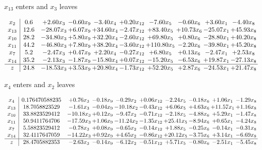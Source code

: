 \documentclass[9pt]{article}
\begin{document}
 $ x_{13} $ enters and $ x_{3} $ leaves 

 \[\begin{array}{c| c c@{\hskip 2pt} c@{\hskip 2pt} c@{\hskip 2pt} c@{\hskip 2pt} c@{\hskip 2pt} c@{\hskip 2pt} c@{\hskip 2pt} c@{\hskip 2pt} }
 x_{2}   &  0.6 & +  2.60 x_{3} & -0.60 x_{9} & -3.40 x_{4} & +  0.20 x_{12} & -7.60 x_{5} & -0.60 x_{6} & +  3.60 x_{1} & -4.40 x_{8}\\
 x_{13}   &  12.6 & -28.07 x_{3} & +  6.07 x_{9} & + 34.60 x_{4} & -2.47 x_{12} & + 83.40 x_{5} & + 10.73 x_{6} & -25.07 x_{1} & + 45.93 x_{8}\\
 x_{10}   &  28.2 & -34.80 x_{3} & +  5.80 x_{9} & + 32.20 x_{4} & -2.60 x_{12} & + 69.80 x_{5} & +  0.80 x_{6} & -28.80 x_{1} & + 40.20 x_{8}\\
 x_{11}   &  44.2 & -46.80 x_{3} & +  7.80 x_{9} & + 38.20 x_{4} & -3.60 x_{12} & + 110.80 x_{5} & -2.20 x_{6} & -39.80 x_{1} & + 45.20 x_{8}\\
 x_{7}   &  5.2 & -2.47 x_{3} & +  0.47 x_{9} & +  2.20 x_{4} & -0.27 x_{12} & +  6.80 x_{5} & +  0.13 x_{6} & -2.47 x_{1} & +  2.53 x_{8}\\
 x_{14}   &  35.2 & -2.13 x_{3} & -1.87 x_{9} & -15.80 x_{4} & +  0.07 x_{12} & -15.20 x_{5} & -6.53 x_{6} & + 19.87 x_{1} & -27.13 x_{8}\\
\hline
z    &  24.8 & -18.53 x_{3} & +  3.53 x_{9} & + 20.80 x_{4} & -1.73 x_{12} & + 52.20 x_{5} & +  2.87 x_{6} & -24.53 x_{1} & + 21.47 x_{8}\\
\end{array}\]


 $ x_{4} $ enters and $ x_{2} $ leaves 

 \[\begin{array}{c| c c@{\hskip 2pt} c@{\hskip 2pt} c@{\hskip 2pt} c@{\hskip 2pt} c@{\hskip 2pt} c@{\hskip 2pt} c@{\hskip 2pt} c@{\hskip 2pt} }
 x_{4}   &  0.176470588235 & +  0.76 x_{3} & -0.18 x_{9} & -0.29 x_{2} & +  0.06 x_{12} & -2.24 x_{5} & -0.18 x_{6} & +  1.06 x_{1} & -1.29 x_{8}\\
 x_{13}   &  18.7058823529 & -1.61 x_{3} & -0.04 x_{9} & -10.18 x_{2} & -0.43 x_{12} & +  6.06 x_{5} & +  4.63 x_{6} & + 11.57 x_{1} & +  1.16 x_{8}\\
 x_{10}   &  33.8823529412 & -10.18 x_{3} & +  0.12 x_{9} & -9.47 x_{2} & -0.71 x_{12} & -2.18 x_{5} & -4.88 x_{6} & +  5.29 x_{1} & -1.47 x_{8}\\
 x_{11}   &  50.9411764706 & -17.59 x_{3} & +  1.06 x_{9} & -11.24 x_{2} & -1.35 x_{12} & + 25.41 x_{5} & -8.94 x_{6} & +  0.65 x_{1} & -4.24 x_{8}\\
 x_{7}   &  5.58823529412 & -0.78 x_{3} & +  0.08 x_{9} & -0.65 x_{2} & -0.14 x_{12} & +  1.88 x_{5} & -0.25 x_{6} & -0.14 x_{1} & -0.31 x_{8}\\
 x_{14}   &  32.4117647059 & -14.22 x_{3} & +  0.92 x_{9} & +  4.65 x_{2} & -0.86 x_{12} & + 20.12 x_{5} & -3.75 x_{6} & +  3.14 x_{1} & -6.69 x_{8}\\
\hline
z    &  28.4705882353 & -2.63 x_{3} & -0.14 x_{9} & -6.12 x_{2} & -0.51 x_{12} & +  5.71 x_{5} & -0.80 x_{6} & -2.51 x_{1} & -5.45 x_{8}\\
\end{array}\]
\end{document}
